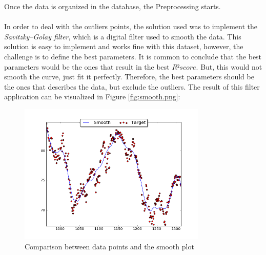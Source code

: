 Once the data is organized in the database, the Preprocessing starts.\\
\\
In order to deal with the outliers points, the solution used was to implement the \textit{Savitzky–Golay filter}, which is a digital filter used to smooth the data\cite{filter}. This solution is 
easy to implement and works fine with this dataset, however, the challenge is to define the best parameters. It is common to conclude that the best parameters would be the ones that result in the 
best $R² score$. But, this would not smooth the curve, just fit it perfectly. Therefore, the best parameters should be the ones that describes the data, but exclude the outliers. The result of
this filter application can be visualized in Figure \ref{fig:smooth.png}:
\\
\begin{figure}[H]
\centering
\includegraphics[width=0.8\textwidth]{figures/smooth.png}
\caption{\label{fig:data} Comparison between data points and the smooth plot}
\label{fig:smooth}
\end{figure}
\ \\


